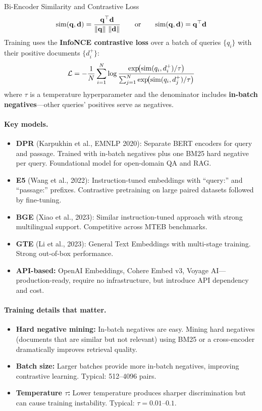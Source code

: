 \begin{mathresult}{Bi-Encoder Similarity and Contrastive Loss}
\[
    \text{sim}(\mathbf{q}, \mathbf{d}) = \frac{\mathbf{q}^\top \mathbf{d}}{\left\lVert\mathbf{q}\right\rVert\,\left\lVert\mathbf{d}\right\rVert}
    \qquad \text{or} \qquad
    \text{sim}(\mathbf{q}, \mathbf{d}) = \mathbf{q}^\top \mathbf{d}
\]
Training uses the \textbf{InfoNCE contrastive loss} over a batch of queries
$\{q_i\}$ with their positive documents $\{d_i^+\}$:
\[
    \mathcal{L} = -\frac{1}{N}\sum_{i=1}^{N}
    \log \frac{\exp\!\bigl(\text{sim}(q_i, d_i^+)/\tau\bigr)}
    {\sum_{j=1}^{N} \exp\!\bigl(\text{sim}(q_i, d_j^+)/\tau\bigr)}
\]
where $\tau$ is a temperature hyperparameter and the denominator includes
\textbf{in-batch negatives}---other queries' positives serve as negatives.
\end{mathresult}

\paragraph{Key models.}
\begin{itemize}
    \item \textbf{DPR} (Karpukhin et al., EMNLP 2020): Separate BERT encoders
          for query and passage.  Trained with in-batch negatives plus one BM25
          hard negative per query.  Foundational model for open-domain QA and RAG.
    \item \textbf{E5} (Wang et al., 2022): Instruction-tuned embeddings with
          ``query:'' and ``passage:'' prefixes.  Contrastive pretraining on
          large paired datasets followed by fine-tuning.
    \item \textbf{BGE} (Xiao et al., 2023): Similar instruction-tuned approach
          with strong multilingual support.  Competitive across MTEB benchmarks.
    \item \textbf{GTE} (Li et al., 2023): General Text Embeddings with
          multi-stage training.  Strong out-of-box performance.
    \item \textbf{API-based:} OpenAI Embeddings, Cohere Embed v3, Voyage AI---
          production-ready, require no infrastructure, but introduce API
          dependency and cost.
\end{itemize}

\paragraph{Training details that matter.}
\begin{itemize}
    \item \textbf{Hard negative mining:} In-batch negatives are easy.  Mining
          hard negatives (documents that are similar but not relevant) using
          BM25 or a cross-encoder dramatically improves retrieval quality.
    \item \textbf{Batch size:} Larger batches provide more in-batch negatives,
          improving contrastive learning.  Typical: 512--4096 pairs.
    \item \textbf{Temperature $\tau$:} Lower temperature produces sharper
          discrimination but can cause training instability.  Typical:
          $\tau = 0.01$--$0.1$.
\end{itemize}


